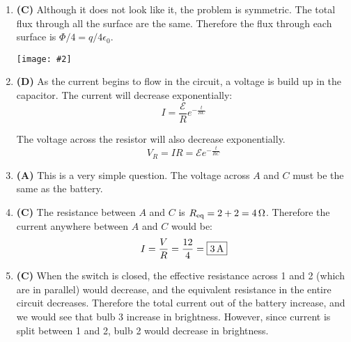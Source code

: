 \documentclass{../oss-handout}
\newcommand{\pic}[2]{\texttt{[image: \#2]}}
\begin{document}
\begin{enumerate}[leftmargin=17pt]
  
\item\textbf{(C)} Although it does not look like it, the problem is symmetric. The total
flux through all the surface are the same. Therefore the flux through each surface is
$\Phi/4=\boxed{q/4\epsilon_0}$.
\begin{center}
  \pic{.2}{tetrahedral}
\end{center}


\item\textbf{(D)} As the current begins to flow in the circuit, a voltage is build up in the capacitor.
  The current will decrease exponentially:
  \begin{displaymath}
    I=\frac{\mathcal E}Re^{-\frac t{RC}}
  \end{displaymath}
  \begin{center}
  \end{center}
  The voltage across the resistor will also decrease exponentially.
  \begin{displaymath}
    V_R=IR = \mathcal Ee^{-\frac t{RC}}
 \end{displaymath}


\item\textbf{(A)} This is a very simple question. The voltage across $A$ and $C$ must be the same
as the battery.

\item\textbf{(C)} The resistance between $A$ and $C$ is $R_\text{eq}=2+2=\SI4\ohm$. Therefore the current 
  anywhere between $A$ and $C$ would be:
  \begin{displaymath}
    I=\frac VR=\frac{12}4=\boxed{\SI3\ampere}
  \end{displaymath}


\item\textbf{(C)} When the switch is closed, the effective resistance across 1 and 2 (which are in parallel)
would decrease, and the equivalent resistance in the entire circuit decreases. Therefore the 
total current out of the battery increase, and we would see that bulb 3 increase in brightness. However,
since current is split between 1 and 2, bulb 2 would decrease in brightness.


\end{enumerate}
\end{document}
